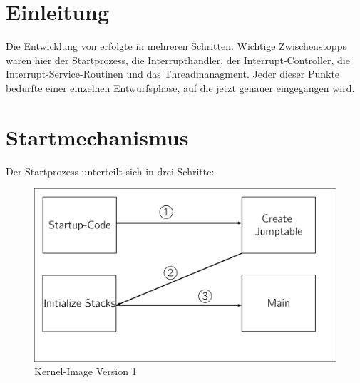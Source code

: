 \section{Einleitung}
Die Entwicklung von \mops erfolgte in mehreren Schritten. Wichtige Zwischenstopps waren hier der Startprozess, die Interrupthandler, der Interrupt-Controller, die Interrupt-Service-Routinen und das Threadmanagment. Jeder dieser Punkte bedurfte einer einzelnen Entwurfsphase, auf die jetzt genauer eingegangen wird.
\section{Startmechanismus}
\label{e1:start}
Der Startprozess unterteilt sich in drei Schritte:

	\begin{figure}[h]
		\centering
					\includegraphics[scale=0.60]{common/kernel-img.pdf}	
		\caption{Kernel-Image Version 1}
		\label{draft:kernelImage}
	\end{figure}
